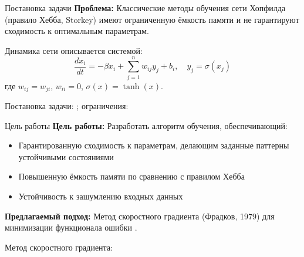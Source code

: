 \documentclass[10pt, aspectratio=169]{beamer}
\theoremstyle{plain}
\begin{document}


\begin{frame}
  \titlepage
\end{frame}

\begin{frame}{Постановка задачи}
  \textbf{Проблема:} Классические методы обучения сети Хопфилда (правило Хебба, Storkey) имеют ограниченную ёмкость памяти и не гарантируют сходимость к оптимальным параметрам.

  \begin{definition}
    Динамика сети описывается системой:
    \begin{equation}
      \frac{dx_i}{dt} = -\beta x_i + \sum_{j=1}^{n} w_{ij} y_j + b_i, \quad y_j = \sigma(x_j)
    \end{equation}
    где \(w_{ij} = w_{ji}\), \(w_{ii} = 0\), \(\sigma(x) = \tanh(x)\).
  \end{definition}

  \small{Постановка задачи: \cite{hopfield1984,hertz1991}; ограничения: \cite{storkey1997}}
\end{frame}

\begin{frame}{Цель работы}
  \textbf{Цель работы:} Разработать алгоритм обучения, обеспечивающий:
  \begin{itemize}
    \item Гарантированную сходимость к параметрам, делающим заданные паттерны устойчивыми состояниями
    \item Повышенную ёмкость памяти по сравнению с правилом Хебба
    \item Устойчивость к зашумлению входных данных
  \end{itemize}

  \textbf{Предлагаемый подход:} Метод скоростного градиента (Фрадков, 1979) для минимизации функционала ошибки \cite{fradkov1979,fradkov2020}.

  \small{Метод скоростного градиента: \cite{fradkov1979,fradkov2020,teryaev2024}}
\end{frame}
\end{document}
